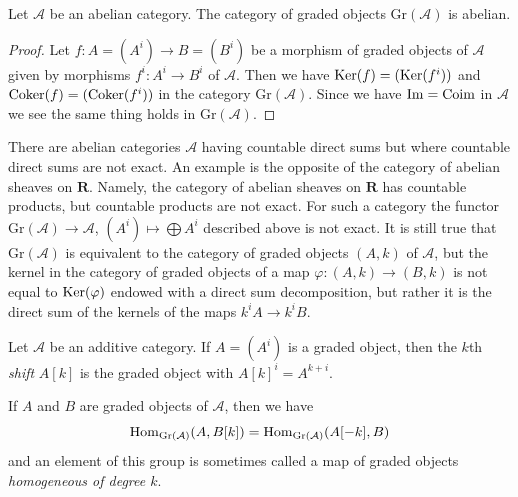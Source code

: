 \begin{lemma}
\label{lemma-graded}
Let $\mathcal{A}$ be an abelian category. The category of graded objects
$\text{Gr}(\mathcal{A})$ is abelian.
\end{lemma}

\begin{proof}
Let $f : A = (A^i) \to B = (B^i)$ be a morphism of graded objects
of $\mathcal{A}$ given by
morphisms $f^i : A^i \to B^i$ of $\mathcal{A}$.
Then we have $\mathop{\mathrm{Ker}}(f) = (\mathop{\mathrm{Ker}}(f^i))$ and $\mathop{\mathrm{Coker}}(f) = (\mathop{\mathrm{Coker}}(f^i))$
in the category $\text{Gr}(\mathcal{A})$.
Since we have $\mathop{\mathrm{Im}} = \mathop{\mathrm{Coim}}$ in $\mathcal{A}$
we see the same thing holds in $\text{Gr}(\mathcal{A})$.
\end{proof}

\begin{remark}[Warning]
\label{remark-direct-sums-not-exact}
There are abelian categories $\mathcal{A}$ having countable direct sums
but where countable direct sums are not exact. An example
is the opposite of the category of abelian sheaves on $\mathbf{R}$.
Namely, the category of abelian sheaves on $\mathbf{R}$ has
countable products, but countable products are not exact.
For such a category the functor $\text{Gr}(\mathcal{A}) \to \mathcal{A}$,
$(A^i) \mapsto \bigoplus A^i$
described above is not exact. It is still true that
$\text{Gr}(\mathcal{A})$ is equivalent to the category of
graded objects $(A, k)$ of $\mathcal{A}$, but the kernel in the category
of graded objects of a map $\varphi : (A, k) \to (B, k)$ is not equal to
$\mathop{\mathrm{Ker}}(\varphi)$ endowed with a direct sum decomposition, but rather it is
the direct sum of the kernels of the maps $k^iA \to k^iB$.
\end{remark}

\begin{definition}
\label{definition-graded-shift}
Let $\mathcal{A}$ be an additive category. If $A = (A^i)$ is a graded object,
then the $k$th {\it shift} $A[k]$ is the graded object with
$A[k]^i = A^{k + i}$.
\end{definition}

\noindent
If $A$ and $B$ are graded objects of $\mathcal{A}$, then we have
\begin{equation}
\label{equation-hom-into-shift}
\mathop{\mathrm{Hom}}\nolimits_{\text{Gr}(\mathcal{A})}(A, B[k]) =
\mathop{\mathrm{Hom}}\nolimits_{\text{Gr}(\mathcal{A})}(A[-k], B)
\end{equation}
and an element of this group is sometimes called a map of graded
objects {\it homogeneous of degree $k$}.

